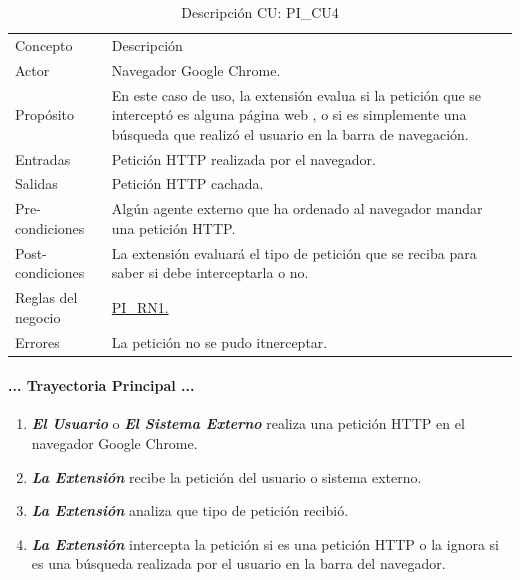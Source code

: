 \documentclass[12pt, a4paper, titlepage]{article}
\begin{document}
			    \begin{table}[htb]
				\begin{center}
				\begin{tabular}{ |p{3.5cm}||p{9.5cm}|}
					\hline
					\rowcolor{guindapoli}
					\multicolumn{2}{|c|}{\textbf{\textcolor{white}{Caso de uso: PI\_CU4. Validar petición.}}}\\
					\hline
					\rowcolor{azulfuerte}Concepto & Descripción\\
					\hline
					\cellcolor{azulclaro}Actor & 
					Navegador Google Chrome.\\ 
					\hline
					\cellcolor{azulclaro}Propósito &
					En este caso de uso, la extensión evalua si la petición que se interceptó es alguna página web , o si es simplemente una búsqueda que realizó el usuario en la barra de navegación.\\
					\hline
					\cellcolor{azulclaro}Entradas &
					Petición HTTP realizada por el navegador.\\
					\hline
					\cellcolor{azulclaro}Salidas &
					Petición HTTP cachada.\\
					\hline
					\cellcolor{azulclaro}Pre-condiciones&
					Algún agente externo que ha ordenado al navegador mandar una petición HTTP.\\
					\hline
					\cellcolor{azulclaro}Post-condiciones&
					La extensión evaluará el tipo de petición que se reciba para saber si debe interceptarla o no.\\
					\hline
					\cellcolor{azulclaro}Reglas del negocio&
					\hyperref[PI_RN1]{PI\_RN1.}\\
					\hline
					\cellcolor{azulclaro}Errores &
					La petición no se pudo itnerceptar.\\
					\hline
				\end{tabular}
				\caption[DCU: PI\_CU4]{Descripción CU: PI\_CU4}
				\end{center}
				\end{table}
				
				\paragraph{... Trayectoria Principal ...}
				\begin{enumerate}
					\item \textbf{\textit{El Usuario}} o \textbf{\textit{El Sistema Externo}} realiza una petición HTTP en el navegador Google Chrome.\\
					\item \textbf{\textit{La Extensión}} recibe la petición del usuario o sistema externo.\\
					\item \textbf{\textit{La Extensión}} analiza que tipo de petición recibió.\\
					\item \textbf{\textit{La Extensión}} intercepta la petición si es una petición HTTP o la ignora si es una búsqueda realizada por el usuario en la barra del navegador. \\
				\end{enumerate}
\end{document}
